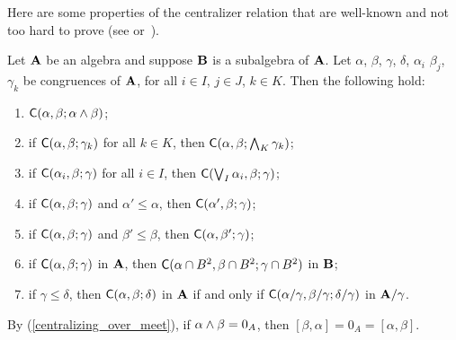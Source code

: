 

Here are some properties of the centralizer relation
that are well-known and not too hard to prove
(see \cite[Prop~3.4]{HM:1988} or~\cite[Thm~2.19]{MR3076179}).
\begin{lem}
\label{lem:centralizers}
Let $\mathbf{A}$ be an algebra and suppose
$\mathbf{B}$ is a subalgebra of $\mathbf{A}$. 
Let $\alpha$, $\beta$, $\gamma$, $\delta$, $\alpha_i$
$\beta_j$, $\gamma_k$
be congruences of $\mathbf{A}$, for all 
$i \in I$, $j\in J$, $k \in K$. Then the following hold:
\begin{enumerate}
\item \label{centralizing_over_meet}
  $\mathsf{C}(\alpha, \beta; \alpha \wedge \beta)$;
\item \label{centralizing_over_meet2}
  if $\mathsf{C}(\alpha,  \beta;  \gamma_k)$ for all $k \in K$, then
  $\mathsf{C}(\alpha,  \beta;  \bigwedge_{K}\gamma_k)$;
\item \label{centralizing_over_join1}
  if $\mathsf{C}(\alpha_i,  \beta;  \gamma)$ for all $i\in I$, then
  $\mathsf{C}(\bigvee_{I}\alpha_i,  \beta; \gamma)$;
\item \label{monotone_centralizers1}
  if $\mathsf{C}(\alpha,  \beta;  \gamma)$ and $\alpha' \leq \alpha$, then 
  $\mathsf{C}(\alpha',  \beta;  \gamma)$;
\item \label{monotone_centralizers2}
  if $\mathsf{C}(\alpha,  \beta;  \gamma)$ and $\beta' \leq \beta$, then
  $\mathsf{C}(\alpha,  \beta';  \gamma)$;
\item \label{centralizing_over_subalg}
  if $\mathsf{C}(\alpha,  \beta;  \gamma)$ in $\mathbf{A}$, 
  then $\mathsf{C}(\alpha\cap B^2,  \beta\cap B^2; \gamma\cap B^2)$ in $\mathbf{B}$;
\item \label{centralizing_factors}
  if $\gamma \leq \delta$, then $\mathsf{C}(\alpha,  \beta;  \delta)$
  in $\mathbf{A}$ if and only if $\mathsf{C}(\alpha/\gamma,  \beta/\gamma;  \delta/\gamma)$
  in $\mathbf{A}/\gamma$.
\end{enumerate}
\end{lem}


\begin{rem}
By (\ref{centralizing_over_meet}), 
if $\alpha \wedge \beta = 0_{A}$,  
then %
$[\beta, \alpha] = 0_A = [\alpha, \beta]$.
\end{rem}

